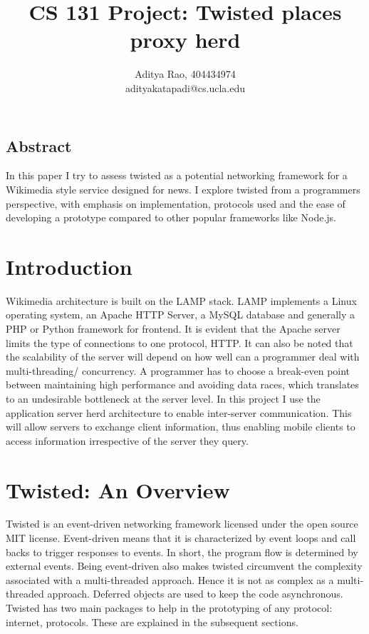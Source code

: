 \documentclass[letterpaper,twocolumn,10pt]{article}
\begin{document}
\date{}

\title{\Large \bf CS 131 Project: Twisted places proxy herd}

\author{
{\rm Aditya Rao, 404434974}\\
adityakatapadi@cs.ucla.edu
}

\maketitle

\thispagestyle{empty}


\subsection*{Abstract}
In this paper I try to assess twisted as a potential networking framework for a Wikimedia style service designed for news. I explore twisted from a programmers perspective, with emphasis on implementation, protocols used and the ease of developing a prototype compared to other popular frameworks like Node.js. 

\section{Introduction}

Wikimedia architecture is built on the LAMP stack. LAMP implements a Linux operating system, an Apache HTTP Server, a MySQL database and generally a PHP or Python framework for frontend. It is evident that the Apache server limits the type of connections to one protocol, HTTP. It can also be noted that the scalability of the server will depend on how well can a programmer deal with multi-threading/ concurrency. A programmer has to choose a break-even point between maintaining high performance and avoiding data races, which translates to an undesirable bottleneck at the server level.
In this project I use the application server herd architecture to enable inter-server communication. This will allow servers to exchange client information, thus enabling mobile clients to access information irrespective of the server they query. 

\section{Twisted: An Overview}
\label{TwistedSection}
Twisted is an event-driven networking framework licensed under the open source MIT license. Event-driven means that it is characterized by event loops and call backs to trigger responses to events. In short, the program flow is determined by external events. 
Being event-driven also makes twisted circumvent the complexity associated with a multi-threaded approach. Hence it is not as complex as a multi-threaded approach.
Deferred objects are used to keep the code asynchronous.  	
Twisted has two main packages to help in the prototyping of any protocol: internet, protocols. These are explained in the subsequent sections.
  
\end{document}
